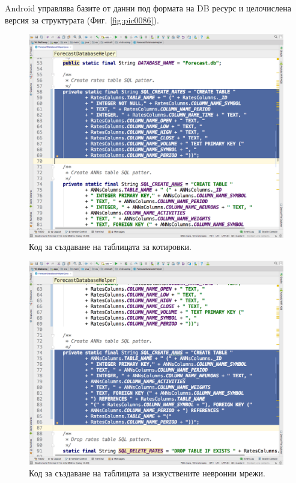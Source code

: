 \documentclass[book,14pt,oneside,openany]{memoir}
\begin{document}
Android управлява базите от данни под формата на DB ресурс и целочислена версия за структурата (Фиг. \ref{fig:pic0086}).

\begin{figure}[h]
  \centering
  \includegraphics[height=0.45\pdfpageheight]{pic0087}
  \caption{Код за създаване на таблицата за котировки.}
\label{fig:pic0087}
\end{figure}
\FloatBarrier

\begin{figure}[h]
  \centering
  \includegraphics[height=0.45\pdfpageheight]{pic0088}
  \caption{Код за създаване на таблицата за изкуствените невронни мрежи.}
\label{fig:pic0088}
\end{figure}
\FloatBarrier
\end{document}
